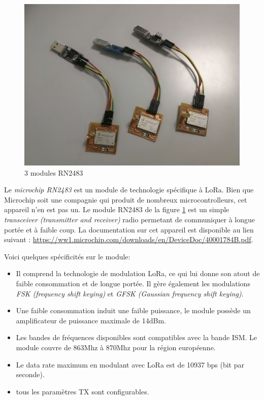 \begin{figure}[h]
\centering

\includegraphics[scale=0.08]{images/rn2483.png}
\caption{3 modules RN2483}\label{term34}
\end{figure}


Le \textit{microchip RN2483} est un module de technologie spécifique à LoRa. Bien que Microchip soit une compagnie qui produit de nombreux microcontrolleurs, cet appareil n'en est pas un. Le module RN2483 de la figure \ref{term34} est un simple \textit{transceiver (transmitter and receiver)} radio permetant de communiquer à longue portée et à faible coup. La documentation sur cet appareil est disponible au lien suivant : \href{https://ww1.microchip.com/downloads/en/DeviceDoc/40001784B.pdf}{https://ww1.microchip.com/downloads/en/DeviceDoc/40001784B.pdf}. 

\vspace{0.1cm}

Voici quelques spécificités sur le module:
\vspace{0.1cm}

\begin{itemize}
\item Il comprend la technologie de modulation LoRa, ce qui lui donne son atout de faible consommation et de longue portée. Il gère également les modulations \textit{FSK (frequency shift keying)} et \textit{GFSK (Gaussian frequency shift keying)}.
\item Une faible consommation induit une faible puissance, le module possède un amplificateur de puissance maximale de 14dBm.
\item Les bandes de fréquences disponibles sont compatibles avec la bande ISM. Le module couvre de 863Mhz à 870Mhz pour la région européenne.
\item Le data rate maximum en modulant avec LoRa est de 10937 bps (bit par seconde).
\item tous les paramètres TX sont configurables.
\end{itemize}

